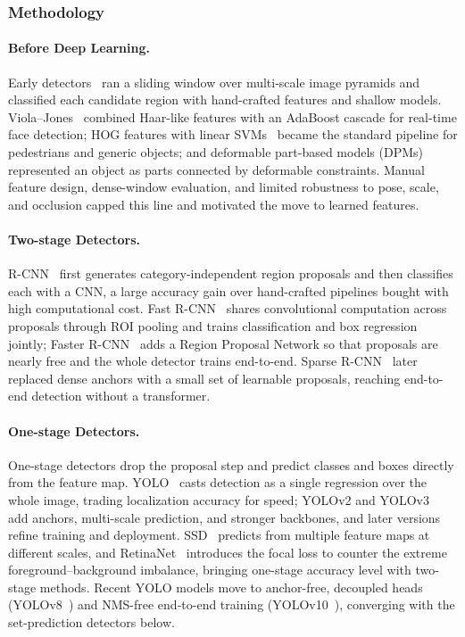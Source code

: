 \subsubsection{Methodology}

\paragraph{Before Deep Learning.}
Early detectors~\cite{zou2019object} ran a sliding window over multi-scale image pyramids and classified each candidate region with hand-crafted features and shallow models. Viola--Jones~\cite{viola_jones_2001} combined Haar-like features with an AdaBoost cascade for real-time face detection; HOG features with linear SVMs~\cite{dalal_triggs_2005} became the standard pipeline for pedestrians and generic objects; and deformable part-based models (DPMs)~\cite{felzenszwalb_dpm_2010} represented an object as parts connected by deformable constraints. Manual feature design, dense-window evaluation, and limited robustness to pose, scale, and occlusion capped this line and motivated the move to learned features.

\paragraph{Two-stage Detectors.}
R-CNN~\cite{girshick2014rcnn} first generates category-independent region proposals and then classifies each with a CNN, a large accuracy gain over hand-crafted pipelines bought with high computational cost. Fast R-CNN~\cite{girshick2015fast} shares convolutional computation across proposals through ROI pooling and trains classification and box regression jointly; Faster R-CNN~\cite{ren2015faster} adds a Region Proposal Network so that proposals are nearly free and the whole detector trains end-to-end. Sparse R-CNN~\cite{sun2021sparsercnn} later replaced dense anchors with a small set of learnable proposals, reaching end-to-end detection without a transformer.

\paragraph{One-stage Detectors.}
One-stage detectors drop the proposal step and predict classes and boxes directly from the feature map. YOLO~\cite{redmon2016yolo} casts detection as a single regression over the whole image, trading localization accuracy for speed; YOLOv2 and YOLOv3~\cite{redmon2017yolo9000, redmon2018yolov3} add anchors, multi-scale prediction, and stronger backbones, and later versions~\cite{bochkovskiy2020yolov4, jocher2020yolov5} refine training and deployment. SSD~\cite{liu2016ssd} predicts from multiple feature maps at different scales, and RetinaNet~\cite{lin2017focal} introduces the focal loss to counter the extreme foreground--background imbalance, bringing one-stage accuracy level with two-stage methods. Recent YOLO models move to anchor-free, decoupled heads (YOLOv8~\cite{jocher2023yolov8}) and NMS-free end-to-end training (YOLOv10~\cite{wang2024yolov10}), converging with the set-prediction detectors below.

